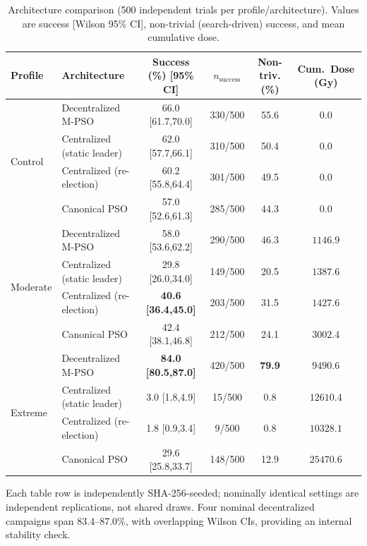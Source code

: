 \documentclass[conference]{IEEEtran}
\begin{document}
\begin{table}[t]
\renewcommand{\arraystretch}{0.85}
\caption{Architecture comparison (500 independent trials per profile/architecture). Values are success [Wilson 95\% CI], non-trivial (search-driven) success, and mean cumulative dose.}
\label{tab:baseline-comparison}
\centering
\scriptsize
\setlength{\tabcolsep}{3pt}
\begin{tabular}{@{}l l c c c c@{}}
\toprule
\textbf{Profile} & \textbf{Architecture} & \textbf{Success (\%) [95\% CI]} & \textbf{$n_{\text{success}}$} & \textbf{Non-triv. (\%)} & \textbf{Cum.\ Dose (Gy)} \\
\midrule
\multirow{4}{*}{Control}
 & Decentralized M-PSO         & 66.0 [61.7,70.0] & 330/500 & 55.6 & $0.0$ \\
 & Centralized (static leader) & 62.0 [57.7,66.1] & 310/500 & 50.4 & $0.0$ \\
 & Centralized (re-election)   & 60.2 [55.8,64.4] & 301/500 & 49.5 & $0.0$ \\
 & Canonical PSO               & 57.0 [52.6,61.3] & 285/500 & 44.3 & $0.0$ \\
\midrule
\multirow{4}{*}{Moderate}
 & Decentralized M-PSO         & 58.0 [53.6,62.2] & 290/500 & 46.3 & $1146.9$ \\
 & Centralized (static leader) & 29.8 [26.0,34.0] & 149/500 & 20.5 & $1387.6$ \\
 & Centralized (re-election)   & \textbf{40.6 [36.4,45.0]} & 203/500 & 31.5 & $1427.6$ \\
 & Canonical PSO               & 42.4 [38.1,46.8] & 212/500 & 24.1 & $3002.4$ \\
\midrule
\multirow{4}{*}{Extreme}
 & Decentralized M-PSO         & \textbf{84.0 [80.5,87.0]} & 420/500 & \textbf{79.9} & $9490.6$ \\
 & Centralized (static leader) & 3.0 [1.8,4.9] & 15/500 & 0.8 & $12610.4$ \\
 & Centralized (re-election)   & 1.8 [0.9,3.4] & 9/500 & 0.8 & $10328.1$ \\
 & Canonical PSO               & 29.6 [25.8,33.7] & 148/500 & 12.9 & $25470.6$ \\
\bottomrule
\end{tabular}

\vspace{2pt}
\raggedright\scriptsize
Each table row is independently SHA-256-seeded; nominally identical settings are independent replications, not shared draws. Four nominal decentralized campaigns span 83.4--87.0\%, with overlapping Wilson CIs, providing an internal stability check.
\end{table}
\end{document}
